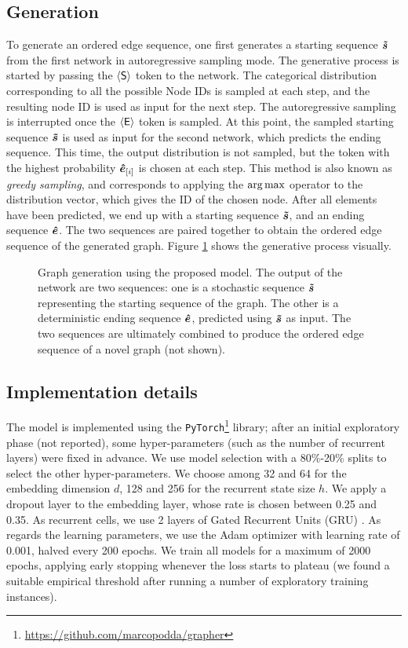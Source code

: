 \subsection{Generation}
To generate an ordered edge sequence, one first generates a starting sequence $\Vector{\tilde{s}}$ from the first network in autoregressive sampling mode. The generative process is started by passing the $\mathsf{\langle S \rangle}$ token to the network. The categorical distribution corresponding to all the possible Node IDs is sampled at each step, and the resulting node ID is used as input for the next step. The autoregressive sampling is interrupted once the $\mathsf{\langle E \rangle}$ token is sampled. At this point, the sampled starting sequence $\Vector{\tilde{s}}$ is used as input for the second network, which predicts the ending sequence. This time, the output distribution is not sampled, but the token with the highest probability $\Elem{\hat{e}}{i}$ is chosen at each step. This method is also known as \emph{greedy sampling}, and corresponds to applying the $\argmax$ operator to the distribution vector, which gives the ID of the chosen node. After all elements have been predicted, we end up with a starting sequence $\Vector{\tilde{s}}$, and an ending sequence $\Vector{\hat{e}}$. The two sequences are paired together to obtain the ordered edge sequence of the generated graph. Figure \ref{fig:model-sampling} shows the generative process visually.
\begin{figure}[h!]
    \centering
    \resizebox{.8\textwidth}{!}{}
    \caption{Graph generation using the proposed model. The output of the network are two sequences: one is a stochastic sequence $\Vector{\tilde{s}}$ representing the starting sequence of the graph. The other is a deterministic ending sequence $\Vector{\hat{e}}$, predicted using $\Vector{\tilde{s}}$ as input. The two sequences are ultimately combined to produce the ordered edge sequence of a novel graph (not shown).}
    \label{fig:model-sampling}
\end{figure}

\subsection{Implementation details}\label{sec:implementation}
The model is implemented using the \texttt{PyTorch}\footnote{\url{https://github.com/marcopodda/grapher}} \cite{paszke2017pytorch} library; after an initial exploratory phase (not reported), some hyper-parameters (such as the number of recurrent layers) were fixed in advance. We use model selection with a 80\%-20\% splits to select the other hyper-parameters. We choose among 32 and 64 for the embedding dimension $d$, 128 and 256 for the recurrent state size $h$. We apply a dropout layer to the embedding layer, whose rate is chosen between 0.25 and 0.35. As recurrent cells, we use 2 layers of Gated Recurrent Units (GRU) \cite{cho2014gru}. As regards the learning parameters, we use the Adam \cite{kingma2015adam} optimizer with learning rate of 0.001, halved every 200 epochs. We train all models for a maximum of 2000 epochs, applying early stopping whenever the loss starts to plateau (we found a suitable empirical threshold after running a number of exploratory training instances).

